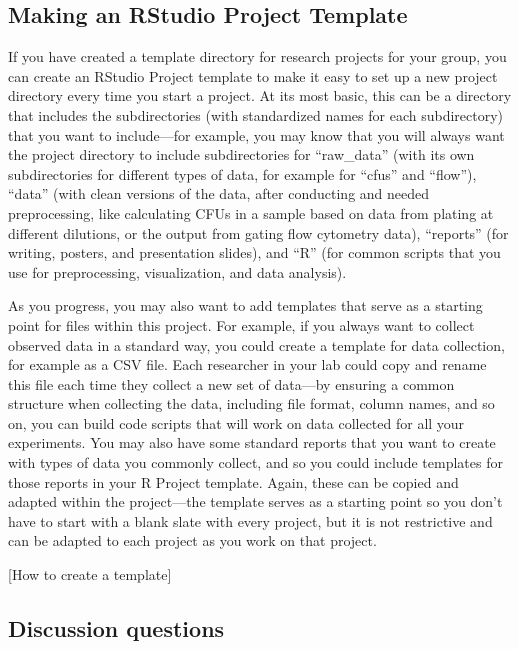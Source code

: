 \documentclass[]{tufte-book}
\begin{document}
\hypertarget{making-an-rstudio-project-template}{%
\subsection{Making an RStudio Project Template}\label{making-an-rstudio-project-template}}

If you have created a template directory for research projects for your group,
you can create an RStudio Project template to make it easy to set up a new
project directory every time you start a project. At its most basic, this can be
a directory that includes the subdirectories (with standardized names for each
subdirectory) that you want to include---for example, you may know that you will
always want the project directory to include subdirectories for ``raw\_data'' (with
its own subdirectories for different types of data, for example for ``cfus'' and
``flow''), ``data'' (with clean versions of the data, after conducting and needed
preprocessing, like calculating CFUs in a sample based on data from plating at
different dilutions, or the output from gating flow cytometry data), ``reports''
(for writing, posters, and presentation slides), and ``R'' (for common scripts
that you use for preprocessing, visualization, and data analysis).

As you progress, you may also want to add templates that serve as a starting point
for files within this project. For example, if you always want to collect
observed data in a standard way, you could create a template for data collection,
for example as a CSV file. Each researcher in your lab could copy and rename this
file each time they collect a new set of data---by ensuring a common structure
when collecting the data, including file format, column names, and so on, you can
build code scripts that will work on data collected for all your experiments. You
may also have some standard reports that you want to create with types of data
you commonly collect, and so you could include templates for those reports in your
R Project template. Again, these can be copied and adapted within the project---the
template serves as a starting point so you don't have to start with a blank slate
with every project, but it is not restrictive and can be adapted to each project
as you work on that project.

{[}How to create a template{]}

\hypertarget{discussion-questions}{%
\subsection{Discussion questions}\label{discussion-questions}}
\end{document}
